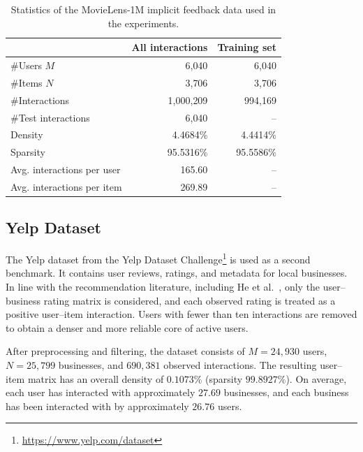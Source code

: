 \documentclass[11pt]{article}
\begin{document}
\begin{table}[t]
    \centering
    \caption{Statistics of the MovieLens-1M implicit feedback data used in the experiments.}
    \label{tab:ml1m_stats}
    \begin{tabular}{lrr}
        \toprule
        & \multicolumn{1}{c}{All interactions} & \multicolumn{1}{c}{Training set} \\
        \midrule
        \#Users $M$                     & 6{,}040        & 6{,}040        \\
        \#Items $N$                     & 3{,}706        & 3{,}706        \\
        \#Interactions                  & 1{,}000{,}209  & 994{,}169      \\
        \#Test interactions             & 6{,}040        & --             \\
        Density                         & 4.4684\%       & 4.4414\%       \\
        Sparsity                        & 95.5316\%      & 95.5586\%      \\
        Avg. interactions per user      & 165.60         & --             \\
        Avg. interactions per item      & 269.89         & --             \\
        \bottomrule
    \end{tabular}
\end{table}

\subsection{Yelp Dataset}

The Yelp dataset from the Yelp Dataset Challenge\footnote{\url{https://www.yelp.com/dataset}} 
is used as a second benchmark. It contains user reviews, ratings, and metadata for local businesses. 
In line with the recommendation literature, including He et al.~\cite{he2018convncf}, only the user--business 
rating matrix is considered, and each observed rating is treated as a positive user--item interaction. Users with 
fewer than ten interactions are removed to obtain a denser and more reliable core of active users.

After preprocessing and filtering, the dataset consists of $M = 24{,}930$ users, $N = 25{,}799$ businesses, and 
$690{,}381$ observed interactions. The resulting user--item matrix has an overall density of $0.1073\%$ 
(sparsity $99.8927\%$). On average, each user has interacted with approximately $27.69$ businesses, and each 
business has been interacted with by approximately $26.76$ users.
\end{document}
